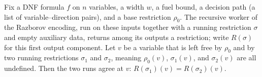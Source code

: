 \begin{lemma}
\label{SwitchingLemma.encode_go_fst_sigma_indep_at_free}
\leanok
{}
Fix a DNF formula $f$ on $n$ variables, a width $w$, a fuel bound, a decision path (a
list of variable–direction pairs), and a base restriction $\rho_0$. The recursive worker
of the Razborov encoding, run on these inputs together with a running restriction
$\sigma$ and empty auxiliary data, returns among its outputs a restriction; write
$R(\sigma)$ for this first output component. Let $v$ be a variable that is left free by
$\rho_0$ and by two running restrictions $\sigma_1$ and $\sigma_2$, meaning $\rho_0(v)$,
$\sigma_1(v)$, and $\sigma_2(v)$ are all undefined. Then the two runs agree at $v$:
$R(\sigma_1)(v) = R(\sigma_2)(v)$.
\end{lemma}


